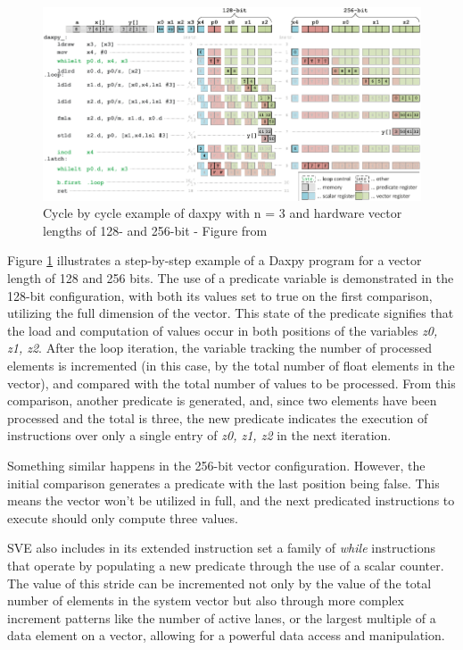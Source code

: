 \begin{figure}[H]
	\begin{center}
 		\includegraphics[width=0.77\linewidth]{images/predicator-example.pdf}
 		\caption{Cycle by cycle example of daxpy with n = 3 and hardware vector lengths of 128- and 256-bit - Figure from \cite{arm-paper}}
 		\label{fig:arm-sve-assembly}
	\end{center} 
\end{figure}

Figure \ref{fig:arm-sve-assembly} illustrates a step-by-step example of a Daxpy program for a vector length of 128 and 256 bits. The use of a predicate variable is demonstrated in the 128-bit configuration, with both its values set to true on the first comparison, utilizing the full dimension of the vector. This state of the predicate signifies that the load and computation of values occur in both positions of the variables \textit{z0, z1, z2}. After the loop iteration,  the variable tracking the number of processed elements is incremented (in this case, by the total number of float elements in the vector), and compared with the total number of values to be processed. From this comparison, another predicate is generated, and, since two elements have been processed and the total is three, the new predicate indicates the execution of instructions over only a single entry of \textit{z0, z1, z2} in the next iteration.

Something similar happens in the 256-bit vector configuration. However, the initial comparison generates a predicate with the last position being false. This means the vector won't be utilized in full, and the next predicated instructions to execute should only compute three values.

SVE also includes in its extended instruction set a family of \textit{while} instructions that operate by populating a new predicate through the use of a scalar counter. The value of this stride can be incremented not only by the value of the total number of elements in the system vector but also through more complex increment patterns like the number of active lanes, or the largest multiple of a data element on a vector, allowing for a powerful data access and manipulation. 

